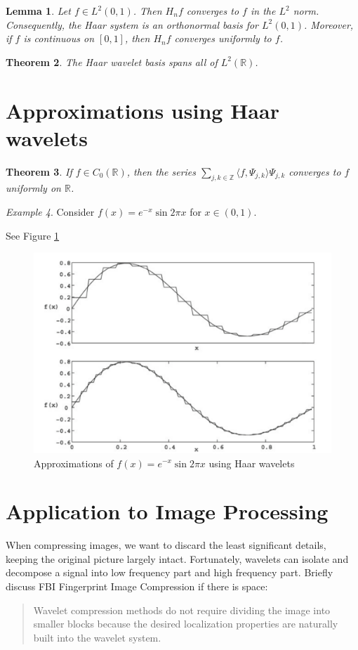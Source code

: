 \documentclass[11pt]{amsart}
\theoremstyle{theorem} %
\newtheorem{thm}{Theorem}[section] %
\newtheorem{lem}[thm]{Lemma} %
\theoremstyle{definition}
\theoremstyle{example}
\theoremstyle{remark}
\newtheorem{exmp}[thm]{Example}
\numberwithin{equation}{section}
\newcommand{\R}{\mathbb{R}}
\newcommand{\Z}{\mathbb{Z}}
\begin{document}
\begin{lem}
	Let $ f \in L^2(0,1) $. Then $ H_nf $ converges to $ f $ in the $ L^2 $ norm. Consequently, the Haar system is an orthonormal basis for $ L^2(0,1) $. Moreover, if $ f $ is continuous on $ [0,1] $, then $ H_nf $ converges uniformly to $ f $.
\end{lem}

\begin{thm}
	The Haar wavelet basis spans all of $ L^2(\R) $.
\end{thm}

\section{Approximations using Haar wavelets}
\begin{thm}
	If $ f \in C_0(\R) $, then the series $ \sum_{j,k \in \Z} \langle f, \varPsi_{j,k} \rangle \varPsi_{j,k} $ converges to $ f $ uniformly on $ \R $.
\end{thm}

\begin{exmp}
	Consider $ f(x) = e^{-x} \sin 2\pi x $ for $ x \in (0,1) $.
	
	See Figure \ref{fig:approximations} 
\end{exmp}

\begin{figure}
	\centering
	\includegraphics[width=0.7\linewidth]{img/approximations}
	\caption{Approximations of $ f(x) = e^{-x} \sin{2\pi x} $ using Haar wavelets}
	\label{fig:approximations}
\end{figure}


\section{Application to Image Processing}
 When compressing images, we want to discard the least significant details, keeping the original picture largely intact. Fortunately, wavelets can isolate and decompose a signal into low frequency part and high frequency part.
 Briefly discuss FBI Fingerprint Image Compression if there is space:
 \begin{quote}
 	 Wavelet compression methods do not require dividing the image into smaller blocks because the desired localization properties are naturally built into the wavelet system.\cite{frazier}
 \end{quote}
\end{document}
